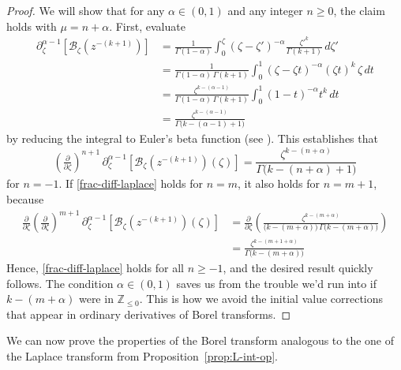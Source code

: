 \documentclass{article}
\newcommand{\Z}{\mathbb{Z}}
\newcommand{\borel}{\mathcal{B}}
\theoremstyle{definition}
\theoremstyle{plain}
\begin{document}
\begin{proof}
We will show that for any $\alpha \in (0, 1)$ and any integer $n \ge 0$, the claim holds with $\mu = n + \alpha$. First, evaluate
\begin{align*}
\partial^{\alpha-1}_{\zeta} \left[ \borel_\zeta \left(z^{-(k+1)}\right) \right] & = \frac{1}{\Gamma(1-\alpha)} \int_0^\zeta (\zeta-\zeta')^{-\alpha} \frac{{\zeta'}^k}{\Gamma(k+1)}\,d\zeta' \\
& = \frac{1}{\Gamma(1-\alpha)\,\Gamma(k+1)} \int_0^1 (\zeta-\zeta t)^{-\alpha} (\zeta t)^k\,\zeta\,dt \\
& = \frac{\zeta^{k-(\alpha-1)}}{\Gamma(1-\alpha)\,\Gamma(k+1)} \int_0^1 (1-t)^{-\alpha} t^k\,dt \\
& = \frac{\zeta^{k-(\alpha-1)}}{\Gamma\big(k-(\alpha-1)+1\big)}
\end{align*}
by reducing the integral to Euler's beta function (see \cite[Identity 5.12.1]{dlmf}). This establishes that
\begin{equation}\label{frac-diff-laplace}
\left(\tfrac{\partial}{\partial \zeta}\right)^{n+1}\,\partial^{\alpha-1}_{\zeta } \left[ \borel_\zeta \left(z^{-(k+1)}\right)(\zeta) \right] = \frac{\zeta^{k-(n+\alpha)}}{\Gamma\big(k-(n+\alpha)+1\big)}
\end{equation}
for $n = -1$. If \eqref{frac-diff-laplace} holds for $n = m$, it also holds for $n = m+1$, because
\begin{align*}
\tfrac{\partial}{\partial \zeta} \left(\tfrac{\partial}{\partial \zeta}\right)^{m+1}\,\partial^{\alpha-1}_{\zeta} \left[ \borel_\zeta \left(z^{-(k+1)}\right)(\zeta) \right] & = \tfrac{\partial}{\partial \zeta} \left( \frac{\zeta^{k-(m+\alpha)}}{\big(k-(m+\alpha)\big)\,\Gamma\big(k-(m+\alpha)\big)} \right) \\
& = \frac{\zeta^{k-(m+1+\alpha)}}{\Gamma\big(k-(m+\alpha)\big)}
\end{align*}
Hence, \eqref{frac-diff-laplace} holds for all $n \ge -1$, and the desired result quickly follows. The condition $\alpha \in (0, 1)$ saves us from the trouble we'd run into if $k-(m+\alpha)$ were in $\Z_{\le 0}$. This is how we avoid the initial value corrections that appear in ordinary derivatives of Borel transforms.
\end{proof}
We can now prove the properties of the Borel transform analogous to the one of the Laplace transform from Proposition~\ref{prop:L-int-op}.
\end{document}
